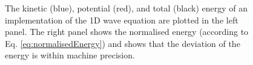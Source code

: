 {{\begin{figure}[h]
    \centering
      \caption{The kinetic (blue), potential (red), and total (black) energy of an implementation of the 1D wave equation are plotted in the left panel. The right panel shows the normalised energy (according to Eq. \eqref{eq:normalisedEnergy}) and shows that the deviation of the energy is within machine precision. \label{fig:energy1DWave}}
\end{figure}

}}
